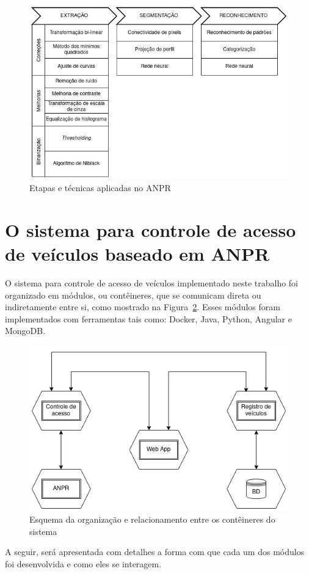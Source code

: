 \documentclass[12pt]{article}
\begin{document}
\begin{figure}[ht]
	\centering
	\includegraphics[width=.8\textwidth]{anpr-steps.jpg}
	\caption{Etapas e técnicas aplicadas no ANPR}
	\label{fig:anpr-steps}
\end{figure} 


\section{O sistema para controle de acesso de veículos baseado em ANPR}

O sistema para controle de acesso de veículos implementado neste trabalho foi organizado em módulos, ou contêineres, que se comunicam direta ou indiretamente entre si, como mostrado na Figura~\ref{fig:anpr-auth}. Esses módulos foram implementados com ferramentas tais como: Docker, Java, Python, Angular e MongoDB.

\begin{figure}[ht]
	\centering
	\includegraphics[width=.8\textwidth]{anpr-auth.jpg}
	\caption{Esquema da organização e relacionamento entre os contêineres do sistema}
	\label{fig:anpr-auth}
\end{figure}

A seguir, será apresentada com detalhes a forma com que cada um dos módulos foi desenvolvida e como eles se interagem.
\end{document}
